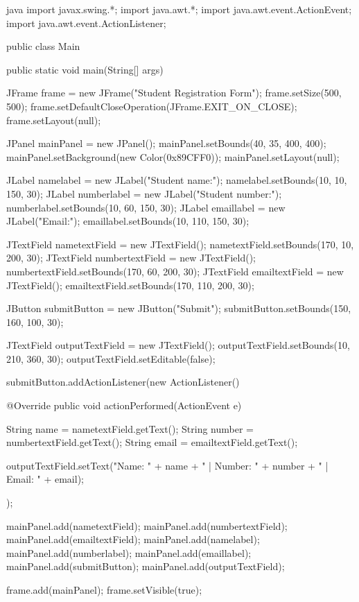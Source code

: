 \begin{codebox}{java}
import javax.swing.*;
import java.awt.*;
import java.awt.event.ActionEvent;
import java.awt.event.ActionListener;

public class Main {
   public static void main(String[] args) {  
      JFrame frame = new JFrame("Student Registration Form");  
      frame.setSize(500, 500);  
      frame.setDefaultCloseOperation(JFrame.EXIT_ON_CLOSE);  
      frame.setLayout(null);  
  
      JPanel mainPanel = new JPanel();  
      mainPanel.setBounds(40, 35, 400, 400);  
      mainPanel.setBackground(new Color(0x89CFF0));  
      mainPanel.setLayout(null);  
  
      JLabel namelabel = new JLabel("Student name:");  
      namelabel.setBounds(10, 10, 150, 30);  
      JLabel numberlabel = new JLabel("Student number:");  
      numberlabel.setBounds(10, 60, 150, 30);  
      JLabel emaillabel = new JLabel("Email:");  
      emaillabel.setBounds(10, 110, 150, 30);  
  
      JTextField nametextField = new JTextField();  
      nametextField.setBounds(170, 10, 200, 30);  
      JTextField numbertextField = new JTextField();  
      numbertextField.setBounds(170, 60, 200, 30);  
      JTextField emailtextField = new JTextField();  
      emailtextField.setBounds(170, 110, 200, 30);  
  
      JButton submitButton = new JButton("Submit");  
      submitButton.setBounds(150, 160, 100, 30);  
  
      JTextField outputTextField = new JTextField();  
      outputTextField.setBounds(10, 210, 360, 30);  
      outputTextField.setEditable(false); 

      submitButton.addActionListener(new ActionListener() {
         @Override
         public void actionPerformed(ActionEvent e) {  
            String name = nametextField.getText();  
            String number = numbertextField.getText();  
            String email = emailtextField.getText();

            outputTextField.setText("Name: " + name + " | Number: " + number + " | Email: " + email);  
         }  
      });  
  
      mainPanel.add(nametextField);  
      mainPanel.add(numbertextField);  
      mainPanel.add(emailtextField);  
      mainPanel.add(namelabel);  
      mainPanel.add(numberlabel);  
      mainPanel.add(emaillabel);  
      mainPanel.add(submitButton);  
      mainPanel.add(outputTextField);  

      frame.add(mainPanel);  
      frame.setVisible(true);  
   }  
}
\end{codebox}

